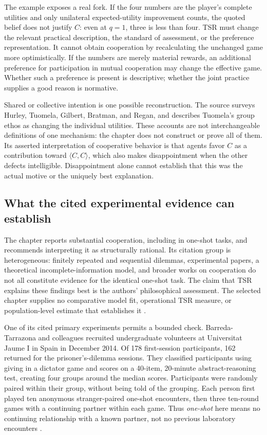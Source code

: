 The example exposes a real fork. If the four numbers are the player's
complete utilities and only unilateral expected-utility improvement
counts, the quoted belief does not justify \(C\): even at \(q=1\),
three is less than four. TSR must change the relevant practical
description, the standard of assessment, or the preference representation.
It cannot obtain cooperation by recalculating the unchanged game more
optimistically. If the numbers are merely material rewards, an additional
preference for participation in mutual cooperation may change the
effective game. Whether such a preference is present is descriptive;
whether the joint practice supplies a good reason is normative.

Shared or collective intention is one possible reconstruction. The
source surveys Hurley, Tuomela, Gilbert, Bratman, and Regan, and describes
Tuomela's group ethos as changing the individual utilities. These accounts
are not interchangeable definitions of one mechanism: the chapter does
not construct or prove all of them. Its asserted interpretation of
cooperative behavior is that agents favor \(C\) as a contribution toward
\(\langle C,C\rangle\), which also makes disappointment when the other
defects intelligible. Disappointment alone cannot establish that this
was the actual motive or the uniquely best explanation.

\subsection{What the cited experimental evidence can establish}

The chapter reports substantial cooperation, including in one-shot
tasks, and recommends interpreting it as structurally rational. Its
citation group is heterogeneous: finitely repeated and sequential
dilemmas, experimental papers, a theoretical incomplete-information
model, and broader works on cooperation do not all constitute evidence
for the identical one-shot task. The claim that TSR explains these
findings best is the authors' philosophical assessment. The selected
chapter supplies no comparative model fit, operational TSR measure, or
population-level estimate that establishes it
\parencite[pp.~626--627]{NidaRumelinGutwaldZuber2021}.

One of its cited primary experiments permits a bounded check.
Barreda-Tarrazona and colleagues recruited undergraduate volunteers at
Universitat Jaume I in Spain in December 2014. Of 178 first-session
participants, 162 returned for the prisoner's-dilemma sessions. They
classified participants using giving in a dictator game and scores on
a 40-item, 20-minute abstract-reasoning test, creating four groups around
the median scores. Participants were randomly paired within their group,
without being told of the grouping. Each person first played ten
anonymous stranger-paired one-shot encounters, then three ten-round
games with a continuing partner within each game. Thus \emph{one-shot}
here means no continuing relationship with a known partner, not no
previous laboratory encounters
\parencite[pp.~3--5]{BarredaTarrazonaEtAl2017Cooperation}.

